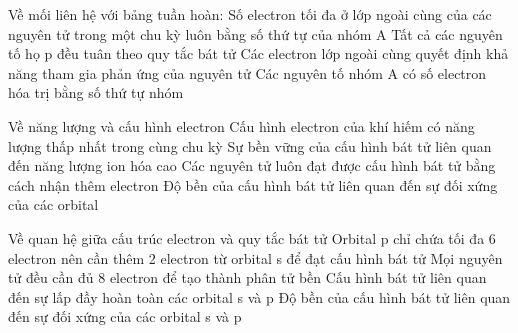 \begin{ex}
	Về mối liên hệ với bảng tuần hoàn:
	\choiceTF
	{\True Số electron tối đa ở lớp ngoài cùng của các nguyên tử trong một chu kỳ luôn bằng số thứ tự của nhóm A}
	{Tất cả các nguyên tố họ p đều tuân theo quy tắc bát tử}
	{\True Các electron lớp ngoài cùng quyết định khả năng tham gia phản ứng của nguyên tử}
	{\True Các nguyên tố nhóm A có số electron hóa trị bằng số thứ tự nhóm}
\end{ex}
\begin{ex}
	Về năng lượng và cấu hình electron
	\choiceTF
	{\True Cấu hình electron của khí hiếm có năng lượng thấp nhất trong cùng chu kỳ}
	{\True Sự bền vững của cấu hình bát tử liên quan đến năng lượng ion hóa cao}
	{Các nguyên tử luôn đạt được cấu hình bát tử bằng cách nhận thêm electron}
	{\True Độ bền của cấu hình bát tử liên quan đến sự đối xứng của các orbital}
\end{ex}
\begin{ex}
	Về quan hệ giữa cấu trúc electron và quy tắc bát tử
	\choiceTF
	{\True Orbital p chỉ chứa tối đa 6 electron nên cần thêm 2 electron từ orbital s để đạt cấu hình bát tử}
	{Mọi nguyên tử đều cần đủ 8 electron để tạo thành phân tử bền}
	{\True Cấu hình bát tử liên quan đến sự lấp đầy hoàn toàn các orbital s và p}
	{\True Độ bền của cấu hình bát tử liên quan đến sự đối xứng của các orbital s và p}
\end{ex}
